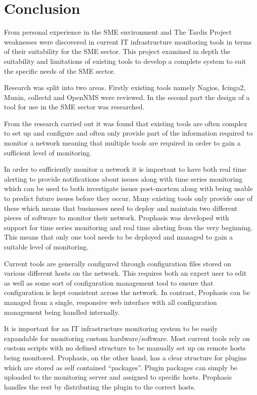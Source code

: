 \documentclass[bsc,deptreport,twoside,parskip,singlespacing,notimes]{infthesis}
\begin{document}
\chapter{Conclusion}
	From personal experience in the SME environment and The Tardis Project weaknesses
	were discovered in current IT infrastructure monitoring tools in terms
	of their suitability for the SME sector.  This project examined in depth the
	suitability and limitations of existing tools to develop a complete system to
	suit the specific needs of the SME sector.
	
	
	Research was split into two areas.  Firstly existing tools namely Nagios, Icinga2,
	Munin, collectd and OpenNMS were reviewed.  In the second part the design of a
	tool for use in the SME sector was researched.
	
	
	From the research carried out it was found that existing tools are often
	complex to set
	up and configure and often only provide part of the information required to
	monitor a network meaning that multiple tools are required in order to gain a
	sufficient level of monitoring.
	
	In order to sufficiently monitor a network it is important to have both real
	time alerting to provide notifications about issues along with time series
	monitoring which can be used to both investigate issues post-mortem along with
	being usable to predict future issues before they occur.  Many existing tools
	only provide one of these which means that businesses need to deploy and
	maintain two different pieces of software to monitor their network.  Prophasis
	was developed with support for time series monitoring and real time alerting
	from the very beginning.  This means that only one tool needs to be deployed
	and managed to gain a suitable level of monitoring.
	
	Current tools are generally configured through configuration files stored on
	various different hosts on the network.  This requires both an expert user to
	edit as well as some sort of configuration management tool to ensure that
	configuration is kept consistent across the network.  In contrast, Prophasis
	can be managed from a single, responsive web interface with all configuration
	management being handled internally.
	
	It is important for an IT infrastructure monitoring system to be easily
	expandable for monitoring custom hardware/software.  Most current tools
	rely on custom scripts with no defined structure to be manually set up on
	remote hosts being monitored.  Prophasis, on the other hand, has a clear
	structure for plugins which are stored as self contained ``packages''. Plugin
	packages can simply be uploaded to the monitoring server and assigned to
	specific hosts.  Prophasis handles the rest by distributing the plugin to the
	correct hosts.
	
\end{document}
